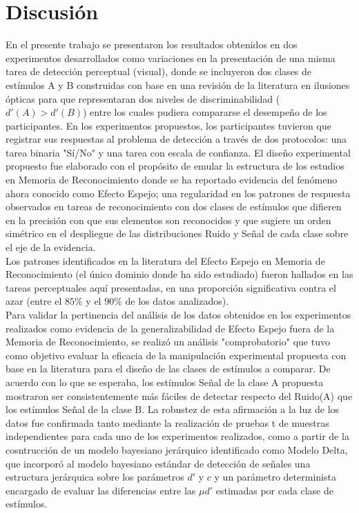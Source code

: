 
\chapter{Discusión} %

\label{Cap_Disc} %

En el presente trabajo se presentaron los resultados obtenidos en dos experimentos desarrollados como variaciones en la presentación de una misma tarea de detección perceptual (visual), donde se incluyeron dos clases de estímulos A y B construidas con base en una revisión de la literatura en ilusiones ópticas para que representaran dos niveles de discriminabilidad ($d'(A)>d'(B)$) entre los cuales pudiera compararse el desempeño de los participantes. En los experimentos propuestos, los participantes tuvieron que registrar sus respuestas al problema de detección a través de dos protocolos: una tarea binaria "Sí/No" y una tarea con escala de confianza. El diseño experimental propuesto fue elaborado con el propósito de emular la estructura de los estudios en Memoria de Reconocimiento donde se ha reportado evidencia del fenómeno ahora conocido como Efecto Espejo; una regularidad en los patrones de respuesta observados en tareas de reconocimiento con dos clases de estímulos que difieren en la precisión con que sus elementos son reconocidos y que sugiere un orden simétrico en el despliegue de las distribuciones Ruido y Señal de cada clase sobre el eje de la evidencia.\\

Los patrones identificados en la literatura del Efecto Espejo en Memoria de Reconocimiento (el único dominio donde ha sido estudiado) fueron hallados en las tareas perceptuales aquí presentadas, en una proporción significativa contra el azar (entre el $85\%$ y el $90\%$ de los datos analizados).\\

Para validar la pertinencia del análisis de los datos obtenidos en los experimentos realizados como evidencia de la generalizabilidad de Efecto Espejo fuera de la Memoria de Reconocimiento, se realizó un análisis "comprobatorio" que tuvo como objetivo evaluar la eficacia de la manipulación experimental propuesta con base en la literatura para el diseño de las clases de estímulos a comparar. De acuerdo con lo que se esperaba, los estímulos Señal de la clase A propuesta mostraron ser consistentemente más fáciles de detectar respecto del Ruido(A) que los estímulos Señal de la clase B. La robustez de esta afirmación a la luz de los datos fue confirmada tanto mediante la realización de pruebas t de muestras independientes para cada uno de los experimentos realizados, como a partir de la cosntrucción de un modelo bayesiano jerárquico identificado como Modelo Delta, que incorporó al modelo bayesiano estándar de detección de señales una estructura jerárquica sobre los parámetros $d'$ y $c$ y un parámetro determinista encargado de evaluar las diferencias entre las $\mu d'$ estimadas por cada clase de estímulos.\\

